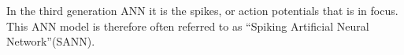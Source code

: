 In the third generation ANN it is the spikes, or action potentials that is in focus. %
This ANN model is therefore often referred to as ``Spiking Artificial Neural Network''(SANN).










